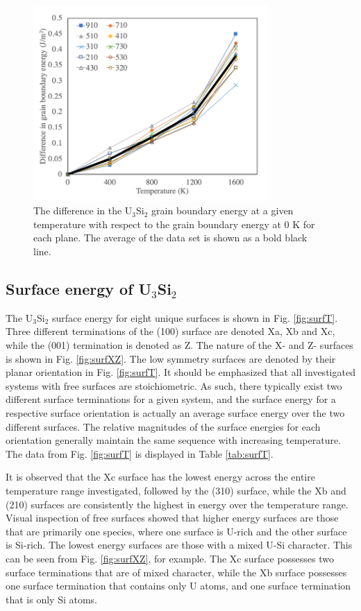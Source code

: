 \documentclass[review]{elsarticle}
\providecommand{\DIFaddtex}[1]{{\protect\color{blue}\uwave{#1}}} %
\providecommand{\DIFaddbegin}{} %
\providecommand{\DIFaddend}{} %
\providecommand{\DIFadd}[1]{\texorpdfstring{\DIFaddtex{#1}}{#1}} %
\newcommand{\DIFaddincludegraphics}[2][]{{\color{blue}\fbox{\DIFOincludegraphics[#1]{#2}}}} %
\DeclareRobustCommand{\DIFaddbegin}{\DIFOaddbegin \let\includegraphics\DIFaddincludegraphics} %
\DeclareRobustCommand{\DIFaddend}{\DIFOaddend \let\includegraphics\DIFOincludegraphics} %
\begin{document}
 \begin{figure}[h]
 \centering
 \includegraphics[width=0.8\textwidth]{deltaGB_vs_T.png} 
 \caption{The difference in the U$_{3}$Si$_{2}$ grain boundary energy at a given temperature with respect to the grain boundary energy at 0 K for each plane. The average of the data set is shown as a bold black line. }
 \label{fig:gbdeltaT}
\end{figure}

\FloatBarrier

\subsection{Surface energy of U$_{3}$Si$_{2}$}

The U$_{3}$Si$_{2}$ surface energy for eight unique surfaces is shown in Fig. \ref{fig:surfT}. Three different terminations of the (100) surface are denoted Xa, Xb and Xc, while the (001) termination is denoted as Z. The nature of the X- and Z- surfaces is shown in Fig. \ref{fig:surfXZ}. The low symmetry surfaces are denoted by their planar orientation in Fig. \ref{fig:surfT}. It should be emphasized that all investigated systems with free surfaces are stoichiometric. As such, there typically exist two different surface terminations for a given system, and the surface energy for a respective surface orientation is actually an average surface energy over the two different surfaces. The relative magnitudes of the surface energies for each orientation generally maintain the same sequence with increasing temperature. The data from Fig. \ref{fig:surfT} is displayed in \DIFaddbegin \DIFadd{the appendix in }\DIFaddend Table \ref{tab:surfT}.

It is observed that the Xc surface has the lowest energy across the entire temperature range investigated, followed by the (310) surface, while the Xb and (210) surfaces are consistently the highest in energy over the temperature range. Visual inspection of free surfaces showed that higher energy surfaces are those that are primarily one species, where one surface is U-rich and the other surface is Si-rich. The lowest energy surfaces are those with a mixed U-Si character. This can be seen from Fig. \ref{fig:surfXZ}, for example. The Xc surface possesses two surface terminations that are of mixed character, while the Xb surface possesses one surface termination that contains only U atoms, and one surface termination that is only Si atoms. 
\end{document}
